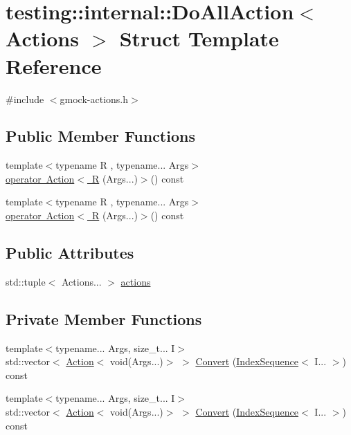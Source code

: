 \hypertarget{structtesting_1_1internal_1_1_do_all_action}{}\section{testing\+::internal\+::Do\+All\+Action$<$ Actions $>$ Struct Template Reference}
\label{structtesting_1_1internal_1_1_do_all_action}


{\ttfamily \#include $<$gmock-\/actions.\+h$>$}

\subsection*{Public Member Functions}
\begin{DoxyCompactItemize}
\item 
{\footnotesize template$<$typename R , typename... Args$>$ }\\\mbox{\hyperlink{structtesting_1_1internal_1_1_do_all_action_a7328dad6615578e385950249f9259139}{operator Action$<$ R}} (Args...)$>$() const
\item 
{\footnotesize template$<$typename R , typename... Args$>$ }\\\mbox{\hyperlink{structtesting_1_1internal_1_1_do_all_action_a7328dad6615578e385950249f9259139}{operator Action$<$ R}} (Args...)$>$() const
\end{DoxyCompactItemize}
\subsection*{Public Attributes}
\begin{DoxyCompactItemize}
\item 
std\+::tuple$<$ Actions... $>$ \mbox{\hyperlink{structtesting_1_1internal_1_1_do_all_action_a613b209674f808b2662ccb9279b59994}{actions}}
\end{DoxyCompactItemize}
\subsection*{Private Member Functions}
\begin{DoxyCompactItemize}
\item 
{\footnotesize template$<$typename... Args, size\+\_\+t... I$>$ }\\std\+::vector$<$ \mbox{\hyperlink{classtesting_1_1_action}{Action}}$<$ void(Args...)$>$ $>$ \mbox{\hyperlink{structtesting_1_1internal_1_1_do_all_action_a80537babe6f6914feb1083fe655dacc9}{Convert}} (\mbox{\hyperlink{structtesting_1_1internal_1_1_index_sequence}{Index\+Sequence}}$<$ I... $>$) const
\item 
{\footnotesize template$<$typename... Args, size\+\_\+t... I$>$ }\\std\+::vector$<$ \mbox{\hyperlink{classtesting_1_1_action}{Action}}$<$ void(Args...)$>$ $>$ \mbox{\hyperlink{structtesting_1_1internal_1_1_do_all_action_a80537babe6f6914feb1083fe655dacc9}{Convert}} (\mbox{\hyperlink{structtesting_1_1internal_1_1_index_sequence}{Index\+Sequence}}$<$ I... $>$) const
\end{DoxyCompactItemize}


